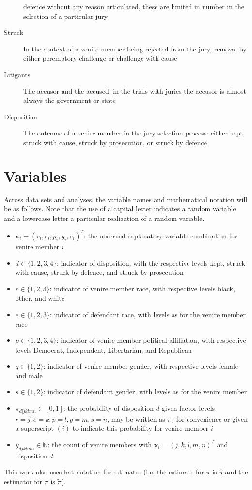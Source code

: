 \begin{description}
  defence without any reason articulated, these are limited in number in the selection of a particular jury
\item[Struck] In the context of a venire member being rejected from the jury, removal by either peremptory challenge or challenge
  with cause
\item[Litigants] The accusor and the accused, in the trials with juries the accusor is almost always the government or state
\item[Disposition] The outcome of a venire member in the jury selection process: either kept, struck with cause, struck by
  prosecution, or struck by defence
\end{description}

\section*{Variables} \label{not:variables}

Across data sets and analyses, the variable names and mathematical notation will be as follows. Note that the use of a capital
letter indicates a random variable and a lowercase letter a particular realization of a random variable.

\begin{itemize}
\item $\mathbf{x}_i = (r_i,e_i,p_i,g_i,s_i)^T$: the observed explanatory variable combination for venire member $i$
\item $d \in \{1,2,3,4\}$: indicator of disposition, with the respective levels kept, struck with cause, struck by defence,
  and struck by prosecution
\item $r \in \{1,2,3\}$: indicator of venire member race, with respective levels black, other, and white
\item $e \in \{1,2,3\}$: indicator of defendant race, with levels as for the venire member race
\item $p \in \{1,2,3,4\}$: indicator of venire member political affiliation, with respective levels Democrat, Independent,
  Libertarian, and Republican
\item $g \in \{1,2\}$: indicator of venire member gender, with respective levels female and male
\item $s \in \{1,2\}$: indicator of defendant gender, with levels as for the venire member
\item $\pi_{d|jklmn} \in [0,1]$: the probability of disposition $d$ given factor levels $r = j, e = k, p = l, g = m, s = n$, may
  be written as $\pi_d$ for convenience or given a superscript $(i)$ to indicate this probability for venire member $i$
\item $y_{djklmn} \in \mathbb{N}$: the count of venire members with $\textbf{x}_i = (j,k,l,m,n)^T$ and disposition $d$
\end{itemize}

This work also uses hat notation for estimates (i.e. the estimate for $\pi$ is $\hat{\pi}$ and the estimator for $\pi$ is
$\tilde{\pi}$).

